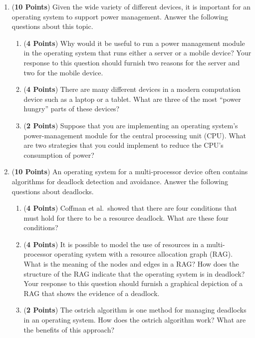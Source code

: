 \documentclass[12pt,epsf,psfig,graphics]{article}
\begin{document}
\begin{enumerate}
  \newpage

\item ({\bf 10 Points}) Given the wide variety of different devices, it is important for an operating system to support
  power management.  Answer the following questions about this topic.

  \begin{enumerate}

    \item ({\bf 4 Points}) Why would it be useful to run a power management module in the operating system that runs
      either a server or a mobile device? Your response to this question should furnish two reasons for the server and
      two for the mobile device.

    \item ({\bf 4 Points}) There are many different devices in a modern computation device such as a laptop or a tablet.
      What are three of the most ``power hungry'' parts of these devices? 

    \item ({\bf 2 Points}) Suppose that you are implementing an operating system's power-management module for the
      central processing unit (CPU).  What are two strategies that you could implement to reduce the CPU's consumption
      of power?

  \end{enumerate}

  \newpage

\item ({\bf 10 Points}) An operating system for a multi-processor device often contains algorithms for deadlock
  detection and avoidance.  Answer the following questions about deadlocks.

  \begin{enumerate}

    \item ({\bf 4 Points}) Coffman et al.\ showed that there are four conditions that must hold for there to be a
      resource deadlock. What are these four conditions?

    \item ({\bf 4 Points}) It is possible to model the use of resources in a multi-processor operating system with a
      resource allocation graph (RAG).  What is the meaning of the nodes and edges in a RAG?  How does the structure of
      the RAG indicate that the operating system is in deadlock? Your response to this question should furnish a
      graphical depiction of a RAG that shows the evidence of a deadlock.

    \item ({\bf 2 Points}) The ostrich algorithm is one method for managing deadlocks in an operating system.  How does
      the ostrich algorithm work? What are the benefits of this approach?

  \end{enumerate}

\end{enumerate}
\end{document}
